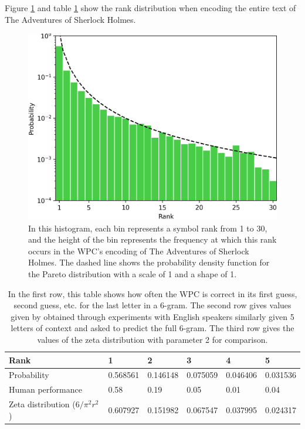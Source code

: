 Figure \ref{fig:predictor_surprisal_histogram} and table \ref{tab:predictor_surprisal} show the rank distribution when encoding the entire text of The Adventures of Sherlock Holmes.

\begin{figure}[h]
\centering
\includegraphics[width=\textwidth]{img/predictor_surprisal_histogram.png}
\caption{In this histogram, each bin represents a symbol rank from 1 to 30, and the height of the bin represents the frequency at which this rank occurs in the WPC's encoding of The Adventures of Sherlock Holmes. The dashed line shows the probability density function for the Pareto distribution with a scale of 1 and a shape of 1.}
\label{fig:predictor_surprisal_histogram}
\end{figure}

\begin{table}[ht]
\centering
\begin{tabular}{ |p{4cm}||p{1.5cm}|p{1.5cm}|p{1.5cm}|p{1.5cm}|p{1.5cm}|  }
 \hline
    Rank & 1 & 2 & 3 & 4 & 5\\
 \hline
    Probability & 0.568561 & 0.146148 & 0.075059 & 0.046406 & 0.031536\\
 \hline
    Human performance & 0.58 & 0.19 & 0.05 & 0.01 & 0.04\\
 \hline
    Zeta distribution ($6/{{\pi^2}{r^2}}$) & 0.607927 & 0.151982 & 0.067547 & 0.037995 & 0.024317\\
 \hline
\end{tabular}
\caption{In the first row, this table shows how often the WPC is correct in its first guess, second guess, etc. for the last letter in a 6-gram. The second row gives values given by \textcite{Shannon1951} obtained through experiments with English speakers similarly given 5 letters of context and asked to predict the full 6-gram. The third row gives the values of the zeta distribution with parameter 2 for comparison.}
\label{tab:predictor_surprisal}
\end{table}



